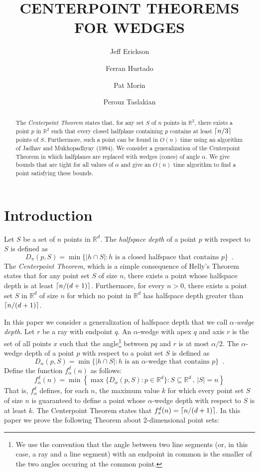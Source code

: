 \documentclass[lotsofwhite]{patmorin}
\title{\MakeUppercase{Centerpoint Theorems for Wedges}}
\author{Jeff Erickson \and
	Ferran Hurtado \and
	Pat Morin \and
	Perouz Taslakian}
\date{}
\begin{document}
\maketitle

\begin{abstract}
The \emph{Centerpoint Theorem} states that, for any set $S$ of $n$
points in $\mathbb{R}^2$, there exists a point $p$ in $\mathbb{R}^2$
such that every closed halfplane containing $p$ contains at least
$\left\lceil n/3 \right\rceil$ points of $S$. Furthermore, such a point can be found in
$O(n)$ time using an algorithm of Jadhav and Mukhopadhyay (1994).  We
consider a generalization of the Centerpoint Theorem in which
halfplanes are replaced with wedges (cones) of angle $\alpha$.  We
give bounds that are tight for all values of $\alpha$ and give an
$O(n)$ time algorithm to find a point satisfying these bounds.
\end{abstract}

\section{Introduction}

Let $S$ be a set of $n$ points in $\mathbb{R}^d$.  The \emph{halfspace
depth} \cite{t75} of a point $p$ with respect to $S$ is defined as
\[
D_\pi(p,S) = 
   \min\{|h\cap S| : \mbox{$h$ is a closed halfspace that contains $p$} \}
    \enspace .
\]
The \emph{Centerpoint Theorem}, which is a simple consequence of
Helly's Theorem \cite{e93} states that for any point set $S$ of size
$n$, there exists a point whose halfspace depth is at least
$\left\lceil n/(d+1) \right\rceil$.  Furthermore, for every $n>0$, there exists a point
set $S$ in $\mathbb{R}^d$ of size $n$ for which no point in
$\mathbb{R}^d$ has halfspace depth greater than $\left\lceil n/(d+1) \right\rceil$. 

In this paper we consider a generalization of halfspace depth that we
call \emph{$\alpha$-wedge depth}. Let $r$ be a ray with endpoint $q$.
An $\alpha$-wedge with apex $q$ and axis $r$ is the set of all points
$x$ such that the angle\footnote{We use the convention that the angle
between two line segments (or, in this case, a ray and a line segment)
with an endpoint in common is the smaller of the two angles occuring
at the common point.} between $pq$ and $r$ is at most $\alpha/2$.  The
$\alpha$-wedge depth of a point $p$ with respect to a point set $S$ is
defined as
\[
D_\alpha(p,S) =
   \min\{|h\cap S| : \mbox{$h$ is an $\alpha$-wedge that contains $p$} \} 
   \enspace .
\]
Define the function $f^d_\alpha(n)$ as follows:
\[
   f^d_\alpha(n) = \min\left\{\max\{D_\alpha(p,S):p\in
\mathbb{R}^d\}: S\subseteq\mathbb{R}^d\, ,\, |S|=n\right\}
\]
That is, $f^d_\alpha$ defines, for each $n$, the maximum value $k$ for
which every point set $S$ of size $n$ is guaranteed to define a point
whose $\alpha$-wedge depth with respect to $S$ is at least $k$.  The
Centerpoint Theorem states that $f^d_\pi(n) = \left\lceil n/(d+1) \right\rceil$.  In this paper
we prove the following Theorem about 2-dimensional point sets:
\end{document}
